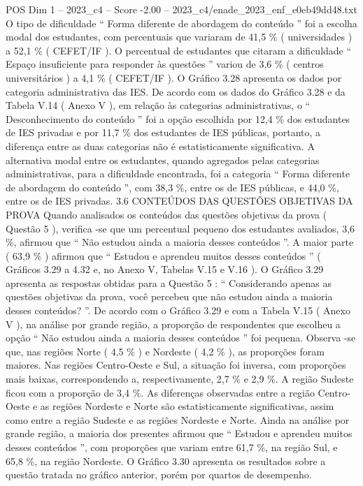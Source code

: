 \begin{textsample}{POS Dim 1 – 2023\_c4 – Score -2.00 – 2023\_c4/enade\_2023\_enf\_e0eb49dd48.txt}
O tipo de dificuldade “ Forma diferente de abordagem do conteúdo ” foi a escolha modal dos estudantes, com percentuais que variaram de 41,5 \% ( universidades ) a 52,1 \% ( CEFET/IF ).
O percentual de estudantes que citaram a dificuldade “ Espaço insuficiente para responder às questões ” variou de 3,6 \% ( centros universitários ) a 4,1 \% ( CEFET/IF ).
O Gráfico 3.28 apresenta os dados por categoria administrativa das IES.
De acordo com os dados do Gráfico 3.28 e da Tabela V.14 ( Anexo V ), em relação às categorias administrativas, o “ Desconhecimento do conteúdo ” foi a opção escolhida por 12,4 \% dos estudantes de IES privadas e por 11,7 \% dos estudantes de IES públicas, portanto, a diferença entre as duas categorias não é estatisticamente significativa.
A alternativa modal entre os estudantes, quando agregados pelas categorias administrativas, para a dificuldade encontrada, foi a categoria “ Forma diferente de abordagem do conteúdo ”, com 38,3 \%, entre os de IES públicas, e 44,0 \%, entre os de IES privadas. 3.6 CONTEÚDOS DAS QUESTÕES OBJETIVAS DA PROVA Quando analisados os conteúdos das questões objetivas da prova ( Questão 5 ), verifica -se que um percentual pequeno dos estudantes avaliados, 3,6 \%, afirmou que “ Não estudou ainda a maioria desses conteúdos ”.
A maior parte ( 63,9 \% ) afirmou que “ Estudou e aprendeu muitos desses conteúdos ” ( Gráficos 3.29 a 4.32 e, no Anexo V, Tabelas V.15 e V.16 ).
O Gráfico 3.29 apresenta as respostas obtidas para a Questão 5 : “ Considerando apenas as questões objetivas da prova, você percebeu que não estudou ainda a maioria desses conteúdos? ”.
De acordo com o Gráfico 3.29 e com a Tabela V.15 ( Anexo V ), na análise por grande região, a proporção de respondentes que escolheu a opção “ Não estudou ainda a maioria desses conteúdos ” foi pequena.
Observa -se que, nas regiões Norte ( 4,5 \% ) e Nordeste ( 4,2 \% ), as proporções foram maiores.
Nas regiões Centro-Oeste e Sul, a situação foi inversa, com proporções mais baixas, correspondendo a, respectivamente, 2,7 \% e 2,9 \%.
A região Sudeste ficou com a proporção de 3,4 \%.
As diferenças observadas entre a região Centro-Oeste e as regiões Nordeste e Norte são estatisticamente significativas, assim como entre a região Sudeste e as regiões Nordeste e Norte.
Ainda na análise por grande região, a maioria dos presentes afirmou que “ Estudou e aprendeu muitos desses conteúdos ”, com proporções que variam entre 61,7 \%, na região Sul, e 65,8 \%, na região Nordeste.
O Gráfico 3.30 apresenta os resultados sobre a questão tratada no gráfico anterior, porém por quartos de desempenho.

\end{textsample}
